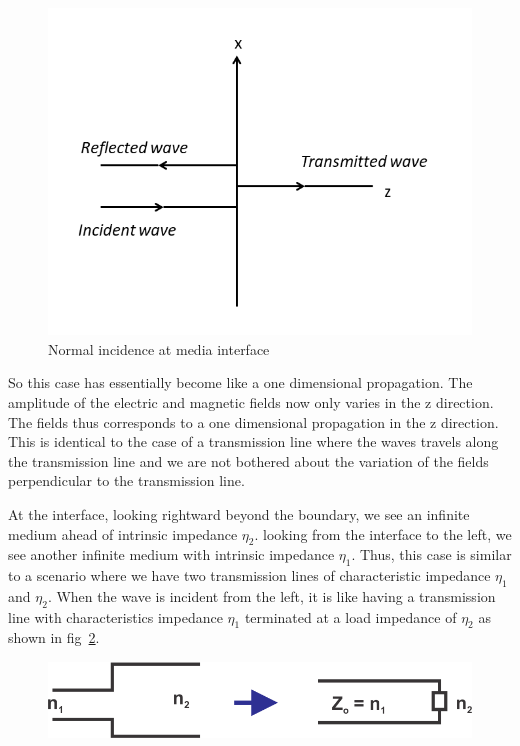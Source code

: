 \begin{figure}[h]
	\centering
	\includegraphics[scale=0.6]{./graphics/normal_incidence1}
	\caption{Normal incidence at media interface}
	\label{fig:16}
\end{figure}
So this case has essentially become like a one dimensional propagation. The amplitude of the electric and magnetic fields now only varies in the z direction. The fields thus corresponds to a one dimensional propagation in the z direction. This is identical to the case of a transmission line where the waves travels along the transmission line and we are not bothered about the variation of the fields perpendicular to the transmission line.

At the interface, looking rightward beyond the boundary, we see an infinite medium ahead of intrinsic impedance $\eta_{2}$. looking from the interface to the left, we see another infinite medium with intrinsic impedance $\eta_{1}$. Thus, this case is similar to a scenario where we have two transmission lines of characteristic impedance $\eta_{1}$ and $\eta_{2}$. When the wave is incident from the left, it is like having a transmission  line with characteristics impedance  $\eta_{1}$ terminated at a load impedance of  $\eta_{2}$ as shown in fig~\ref{fig:17}.
\begin{figure}[h]
\centering
\includegraphics[width=1\linewidth]{./graphics/17}
\caption{}
\label{fig:17}
\end{figure}

